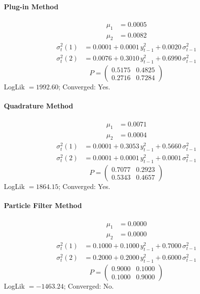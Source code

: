 \documentclass[11pt, a4paper]{article}
\begin{document}
\paragraph{Plug-in Method}
\begin{align}
\mu_{1} &= 0.0005 \\
\mu_{2} &= 0.0082
\end{align}
\begin{align}
\sigma^2_{t}(1) &= 0.0001 + 0.0001\, y_{t-1}^2 + 0.0020\, \sigma^2_{t-1} \\
\sigma^2_{t}(2) &= 0.0076 + 0.3010\, y_{t-1}^2 + 0.6990\, \sigma^2_{t-1}
\end{align}
\begin{equation}
P = \begin{pmatrix} 0.5175 & 0.4825 \\ 0.2716 & 0.7284 \end{pmatrix}
\end{equation}
LogLik $= 1992.60$; Converged: Yes.

\paragraph{Quadrature Method}
\begin{align}
\mu_{1} &= 0.0071 \\
\mu_{2} &= 0.0004
\end{align}
\begin{align}
\sigma^2_{t}(1) &= 0.0001 + 0.3053\, y_{t-1}^2 + 0.5660\, \sigma^2_{t-1} \\
\sigma^2_{t}(2) &= 0.0001 + 0.0001\, y_{t-1}^2 + 0.0001\, \sigma^2_{t-1}
\end{align}
\begin{equation}
P = \begin{pmatrix} 0.7077 & 0.2923 \\ 0.5343 & 0.4657 \end{pmatrix}
\end{equation}
LogLik $= 1864.15$; Converged: Yes.

\paragraph{Particle Filter Method}
\begin{align}
\mu_{1} &= 0.0000 \\
\mu_{2} &= 0.0000
\end{align}
\begin{align}
\sigma^2_{t}(1) &= 0.1000 + 0.1000\, y_{t-1}^2 + 0.7000\, \sigma^2_{t-1} \\
\sigma^2_{t}(2) &= 0.2000 + 0.2000\, y_{t-1}^2 + 0.6000\, \sigma^2_{t-1}
\end{align}
\begin{equation}
P = \begin{pmatrix} 0.9000 & 0.1000 \\ 0.1000 & 0.9000 \end{pmatrix}
\end{equation}
LogLik $= -1463.24$; Converged: No.
\end{document}
